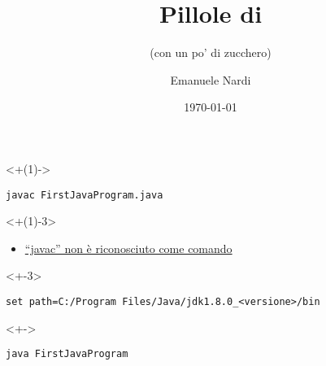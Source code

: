 \documentclass[12pt]{beamer}
\title{Pillole di {\javalogo}}
\subtitle{(con un po' di zucchero)}
\author{Emanuele Nardi}
\institute{Grandi Scuole}
\date{\today}
\begin{document}
\begin{frame}[label=title]
\maketitle
\end{frame}

\begin{frame}[fragile, label=hello-world]

\begin{uncoverenv}<+(1)->
\vfill
\begin{verbatim}
javac FirstJavaProgram.java
\end{verbatim}
\end{uncoverenv}

\uncover<+(1)-3>{
\begin{itemize}
	\item \href{https://docs.oracle.com/javase/8/docs/technotes/guides/install/windows_jdk_install.html#BABGDJFH}{``javac'' non è riconosciuto come comando}
\end{itemize}
}
\begin{uncoverenv}<+-3>
\begin{verbatim}
set path=C:/Program Files/Java/jdk1.8.0_<versione>/bin
\end{verbatim}
\end{uncoverenv}

\begin{uncoverenv}<+->
\begin{verbatim}
java FirstJavaProgram
\end{verbatim}
\end{uncoverenv}

\end{frame}
\end{document}

